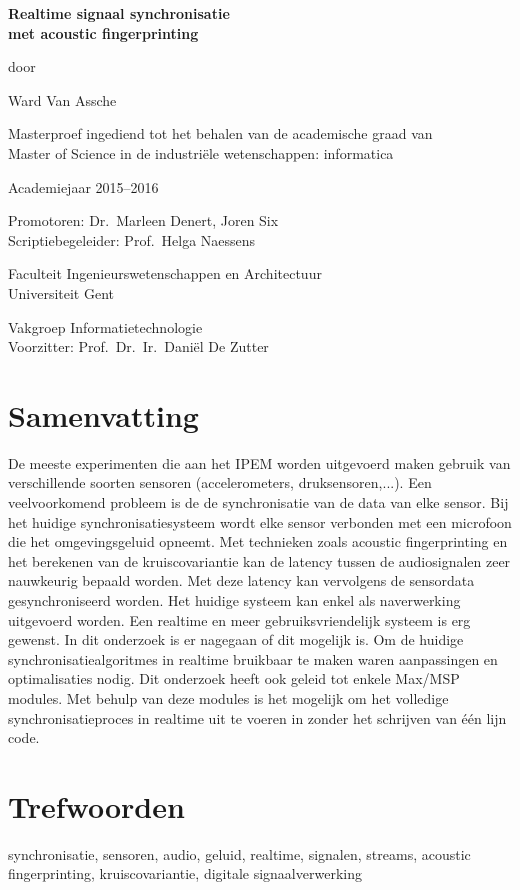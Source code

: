
\newpage

{
\setlength{\baselineskip}{14pt}
\setlength{\parindent}{0pt}
\setlength{\parskip}{8pt}

\begin{center}

\noindent \textbf{\huge
Realtime signaal synchronisatie\\[8pt]
met acoustic fingerprinting
}

door 

Ward Van Assche

Masterproef ingediend tot het behalen van de academische graad van\\
Master of Science in de industriële wetenschappen: informatica

Academiejaar 2015--2016

Promotoren: Dr.~Marleen Denert, Joren Six\\
Scriptiebegeleider: Prof.~Helga Naessens

Faculteit Ingenieurswetenschappen en Architectuur\\
Universiteit Gent

Vakgroep Informatietechnologie\\
Voorzitter: Prof.~Dr.~Ir.~Dani\"{e}l De Zutter


\end{center}

\section*{Samenvatting}

De meeste experimenten die aan het IPEM worden uitgevoerd maken gebruik van verschillende soorten sensoren (accelerometers, druksensoren,...). Een veelvoorkomend probleem is de de synchronisatie van de data van elke sensor. Bij het huidige synchronisatiesysteem wordt elke sensor verbonden met een microfoon die het omgevingsgeluid opneemt. Met technieken zoals acoustic fingerprinting en het berekenen van de kruiscovariantie kan de latency tussen de audiosignalen zeer nauwkeurig bepaald worden. Met deze latency kan vervolgens de sensordata gesynchroniseerd worden. Het huidige systeem kan enkel als naverwerking uitgevoerd worden. Een realtime en meer gebruiksvriendelijk systeem is erg gewenst. In dit onderzoek is er nagegaan of dit mogelijk is. Om de huidige synchronisatiealgoritmes in realtime bruikbaar te maken waren aanpassingen en optimalisaties nodig. Dit onderzoek heeft ook geleid tot enkele Max/MSP modules. Met behulp van deze modules is het mogelijk om het volledige synchronisatieproces in realtime uit te voeren in zonder het schrijven van één lijn code.


\section*{Trefwoorden}


synchronisatie, sensoren, audio, geluid, realtime, signalen, streams, acoustic fingerprinting, kruiscovariantie, digitale signaalverwerking

}
\newpage %
